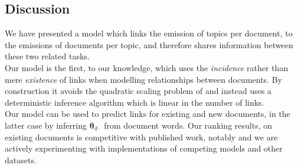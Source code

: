 \documentclass{sciposter}
\newcommand \vv[1] { \bm #1 }
\newcommand \thdo { { \vv{\theta}_{d\cdot} } }
\begin{document}
\begin{multicols}{3}
\section{Discussion}
We have presented a model which links the emission of topics per document, to the emissions of documents per topic, and therefore shares information between these two related tasks. \\

Our model is the first, to our knowledge, which uses the \emph{incidence} rather than mere \emph{existence} of links when modelling relationships between documents. By construction it avoids the quadratic scaling problem of \cite{Chang2009a} and instead uses a deterministic inference algorithm which is linear in the number of links.\\

Our model can be used to predict links for existing and new documents, in the latter case by inferring $\thdo$ from document words. Our ranking results, on existing documents is competitive with published work, notably \cite{Chang2009a}\cite{Neiswanger2014} and we are actively experimenting with implementations of competing models and other datasets.

 






\end{multicols}
\end{document}
